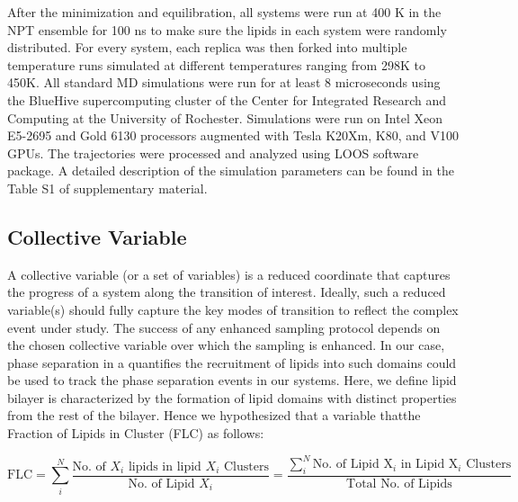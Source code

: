 \documentclass{biophys-new}
\begin{document}
After the minimization and equilibration, all systems were run at 400 K in the NPT ensemble for 100 ns to make sure the lipids in each system were
randomly distributed.
For every system, each replica was then forked into multiple temperature runs simulated at different temperatures ranging from 298K to 450K. 
All standard MD simulations were run for at least 8 microseconds using the BlueHive supercomputing cluster of the Center for Integrated Research and
Computing at the University of Rochester. Simulations were run on Intel Xeon E5-2695 and Gold 6130 processors augmented with Tesla K20Xm, K80, and V100 GPUs.   
The trajectories were processed and analyzed using LOOS software package.
A detailed description of the simulation parameters can be found in the Table S1 of supplementary material.  

\subsection*{Collective Variable}

A collective variable (or a set of variables) is a reduced coordinate that captures the progress of a system along the transition of interest.
Ideally, such a reduced variable(s) should fully capture the key modes of transition to reflect the complex event under study.
The success of any enhanced sampling protocol depends on the chosen collective variable over which the sampling is enhanced\cite{Valsson2016,Yang2019b,Henin2022}. 
In our case, phase separation in a  quantifies the recruitment of lipids into such domains could be used to track the phase separation
events in our systems. Here, we define lipid bilayer is characterized by the formation of lipid domains with distinct properties from the rest of the bilayer.
Hence we hypothesized that a variable thatthe Fraction of Lipids in Cluster (FLC) as follows:

\begin{equation}
\label{eq:CLT}
\text{FLC} = \sum_{i}^{N} \frac{\text{No. of $X_i$ lipids in lipid $X_i$ Clusters}}{\text{No. of Lipid $X_i$}} =  \frac{\sum_{i}^{N} \text{No. of Lipid X$_i$ in Lipid X$_i$ Clusters}}{\text{Total No. of Lipids}}
\end{equation}
\end{document}

